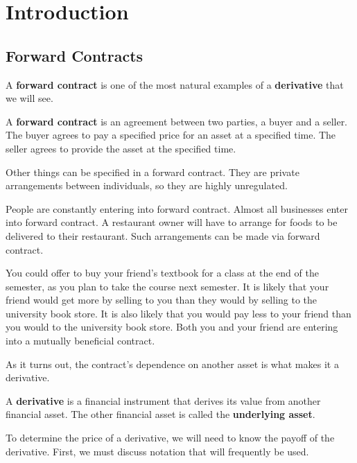 \documentclass{ximera}
\begin{document}
\chapter{Introduction}

\section{Forward Contracts}

A {\bf forward contract} is one of the most natural examples of a {\bf derivative} that we will see. 

\begin{definition}\label{def20}
A {\bf forward contract} is an agreement between two parties, a buyer and a seller. The buyer agrees to pay a specified price for an asset at a specified time. The seller agrees to provide the asset at the specified time.
\end{definition}

\begin{remark}
Other things can be specified in a forward contract. They are private arrangements between individuals, so they are highly unregulated. 
\end{remark}

People are constantly entering into forward contract. Almost all businesses enter into forward contract. A restaurant owner will have to arrange for foods to be delivered to their restaurant. Such arrangements can be made via forward contract. 

You could offer to buy your friend's textbook for a class at the end of the semester, as you plan to take the course next semester. It is likely that your friend would get more by selling to you than they would by selling to the university book store. It is also likely that you would pay less to your friend than you would to the university book store. Both you and your friend are entering into a mutually beneficial contract. 

As it turns out, the contract's dependence on another asset is what makes it a derivative.

\begin{definition}\label{def21}
A {\bf derivative} is a financial instrument that derives its value from another financial asset. The other financial asset is called the {\bf underlying asset}.
\end{definition}

To determine the price of a derivative, we will need to know the payoff of the derivative. First, we must discuss notation that will frequently be used. 
\end{document}
